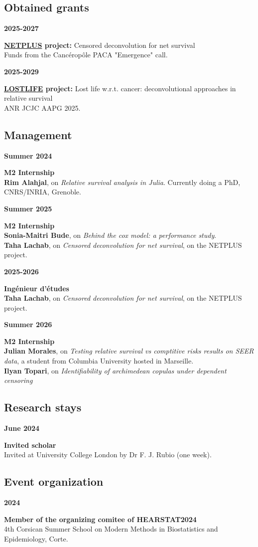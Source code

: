 \documentclass[a4paper,11pt]{article}
\newcommand{\tabcv}[2]{
\begin{minipage}[t]{0.12\linewidth}
\textbf{\footnotesize #1}
\end{minipage}\hfill
\begin{minipage}[t]{0.85\linewidth}
#2
\end{minipage}
\vspace{1em}
}
\begin{document}
\subsection{Obtained grants}
\tabcv{2025-2027}{\textbf{\href{https://sesstim.univ-amu.fr/fr/projet/netplus}{NETPLUS} project:} Censored deconvolution for net survival\\
{\footnotesize
Funds from the Cancéropôle PACA "Emergence" call. 
}}
\tabcv{2025-2029}{\textbf{\href{https://anr.fr/fileadmin/aap/2025/selection/aapg-2025-selection.pdf}{LOSTLIFE} project:} Lost life w.r.t. cancer: deconvolutional approaches in relative survival\\
{\footnotesize
ANR JCJC AAPG 2025. 
}}

\subsection{Management}
\tabcv{Summer 2024}{\textbf{M2 Internship}\\
{\footnotesize
\textbf{Rim Alahjal}, on \textit{Relative survival analysis in Julia}. Currently doing a PhD, CNRS/INRIA, Grenoble.
}}
\tabcv{Summer 2025}{\textbf{M2 Internship}\\
{\footnotesize
\textbf{Sonia-Maitri Bude}, on \textit{Behind the cox model: a performance study}.\\
\textbf{Taha Lachab}, on \textit{Censored deconvolution for net survival}, on the NETPLUS project.
}}
\tabcv{2025-2026}{\textbf{Ingénieur d'études}\\
{\footnotesize
\textbf{Taha Lachab}, on \textit{Censored deconvolution for net survival}, on the NETPLUS project.
}}
\tabcv{Summer 2026}{\textbf{M2 Internship}\\
{\footnotesize
\textbf{Julian Morales}, on \textit{Testing relative survival vs comptitive risks results on SEER data}, a student from Columbia University hosted in Marseille.\\
\textbf{Ilyan Topari}, on \textit{Identifiability of archimedean copulas under dependent censoring}
}}

\subsection{Research stays}
\tabcv{June 2024}{\textbf{Invited scholar}\\
{\footnotesize
Invited at University College London by Dr F. J. Rubio (one week).
}}

\subsection{Event organization}
\tabcv{2024}{\textbf{Member of the organizing comitee of HEARSTAT2024}\\
{\footnotesize
4th Corsican Summer School on Modern Methods in Biostatistics and Epidemiology, Corte.
}}
\end{document}
